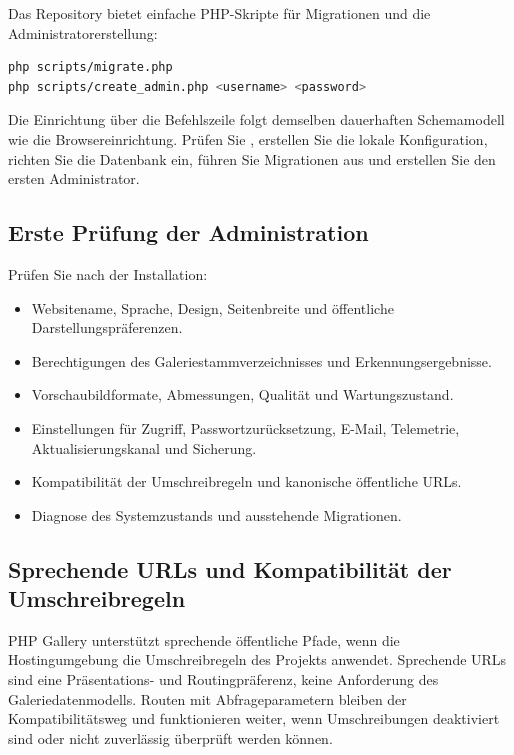 \documentclass[11pt,a4paper]{article}
\newcommand{\filepath}[1]{\path{#1}}
\begin{document}
Das Repository bietet einfache PHP-Skripte für Migrationen und die
Administratorerstellung:

\begin{lstlisting}[language=bash]
php scripts/migrate.php
php scripts/create_admin.php <username> <password>
\end{lstlisting}

Die Einrichtung über die Befehlszeile folgt demselben dauerhaften Schemamodell
wie die Browsereinrichtung. Prüfen Sie \filepath{config.example.php}, erstellen
Sie die lokale Konfiguration, richten Sie die Datenbank ein, führen Sie
Migrationen aus und erstellen Sie den ersten Administrator.

\subsection{Erste Prüfung der Administration}

Prüfen Sie nach der Installation:

\begin{itemize}
  \item Websitename, Sprache, Design, Seitenbreite und öffentliche
  Darstellungspräferenzen.
  \item Berechtigungen des Galeriestammverzeichnisses und Erkennungsergebnisse.
  \item Vorschaubildformate, Abmessungen, Qualität und Wartungszustand.
  \item Einstellungen für Zugriff, Passwortzurücksetzung, E-Mail, Telemetrie,
  Aktualisierungskanal und Sicherung.
  \item Kompatibilität der Umschreibregeln und kanonische öffentliche URLs.
  \item Diagnose des Systemzustands und ausstehende Migrationen.
\end{itemize}

\subsection{Sprechende URLs und Kompatibilität der Umschreibregeln}

PHP Gallery unterstützt sprechende öffentliche Pfade, wenn die Hostingumgebung
die Umschreibregeln des Projekts anwendet. Sprechende URLs sind eine
Präsentations- und Routingpräferenz, keine Anforderung des Galeriedatenmodells.
Routen mit Abfrageparametern bleiben der Kompatibilitätsweg und funktionieren
weiter, wenn Umschreibungen deaktiviert sind oder nicht zuverlässig überprüft
werden können.
\end{document}
